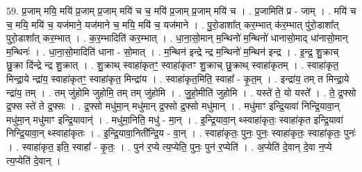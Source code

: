 \documentclass[17pt]{extarticle}
\begin{document}
59. प्र॒जाम् मयि॒ मयि॑ प्र॒जाम् प्र॒जाम् मयि॑ च च॒ मयि॑ प्र॒जाम् प्र॒जाम् मयि॑ च । . प्र॒जामिति॑ प्र - जाम् । . मयि॑ च च॒ मयि॒ मयि॑ च॒ यज॑माने॒ यज॑माने च॒ मयि॒ मयि॑ च॒ यज॑माने । . पु॒रो॒डाशा᳚त् कर॒म्भात् क॑र॒म्भात् पु॑रो॒डाशा᳚त् पुरो॒डाशा᳚त् कर॒म्भात् । . क॒र॒म्भादिति॑ कर॒म्भात् । . धा॒ना॒सो॒मान् म॒न्थिनो॑ म॒न्थिनो॑ धानासो॒माद् धा॑नासो॒मान् म॒न्थिनः॑ । . धा॒ना॒सो॒मादिति॑ धाना - सो॒मात् । . म॒न्थिन॑ इन्द्रे न्द्र म॒न्थिनो॑ म॒न्थिन॑ इन्द्र । . इ॒न्द्र॒ शु॒क्राच् छु॒क्रा दि॑न्द्रे न्द्र शु॒क्रात् । . शु॒क्राथ् स्वाहा॑कृतꣳ॒॒ स्वाहा॑कृतꣳ शु॒क्राच् छु॒क्राथ् स्वाहा॑कृतम् । . स्वाहा॑कृत॒ मिन्द्रा॒ये न्द्रा॑य॒ स्वाहा॑कृतꣳ॒॒ स्वाहा॑कृत॒ मिन्द्रा॑य । . स्वाहा॑कृत॒मिति॒ स्वाहा᳚ - कृ॒त॒म् । . इन्द्रा॑य॒ तम् त मिन्द्रा॒ये न्द्रा॑य॒ तम् । . तम् जु॑होमि जुहोमि॒ तम् तम् जु॑होमि । . जु॒हो॒मीति॑ जुहोमि । . यस्ते॑ ते॒ यो यस्ते᳚ । . ते॒ द्र॒फ्सो द्र॒फ्स स्ते॑ ते द्र॒फ्सः । . द्र॒फ्सो मधु॑मा॒न् मधु॑मान् द्र॒फ्सो द्र॒फ्सो मधु॑मान् । . मधु॑माꣳ इन्द्रि॒यावा॑ निन्द्रि॒यावा॒न् मधु॑मा॒न् मधु॑माꣳ इन्द्रि॒यावान्॑ । . मधु॑मा॒निति॒ मधु॑ - मा॒न् । . इ॒न्द्रि॒यावा॒न् थ्स्वाहा॑कृतः॒ स्वाहा॑कृत इन्द्रि॒यावा॑ निन्द्रि॒यावा॒न् थ्स्वाहा॑कृतः । . इ॒न्द्रि॒यावा॒निती᳚न्द्रि॒य - वा॒न् । . स्वाहा॑कृतः॒ पुनः॒ पुनः॒ स्वाहा॑कृतः॒ स्वाहा॑कृतः॒ पुनः॑ । . स्वाहा॑कृत॒ इति॒ स्वाहा᳚ - कृ॒तः॒ । . पुन॑ र॒प्ये त्य॒प्येति॒ पुनः॒ पुन॑ र॒प्येति॑ । . अ॒प्येति॑ दे॒वान् दे॒वा न॒प्ये त्य॒प्येति॑ दे॒वान् । \newline
\end{document}
